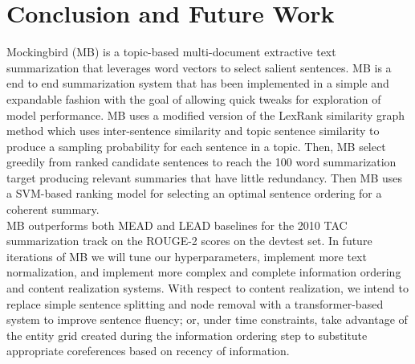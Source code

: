 \documentclass[11pt,a4paper]{article}
\begin{document}
\section{Conclusion and Future Work}
Mockingbird (MB) is a topic-based multi-document extractive text summarization that leverages word vectors to select salient sentences. MB is a end to end summarization system that has been implemented in a simple and expandable fashion with the goal of allowing quick tweaks for exploration of model performance.
MB uses a modified version of the LexRank similarity graph method which uses inter-sentence similarity and topic sentence similarity to produce a sampling probability for each sentence in a topic. Then, MB select greedily from ranked candidate sentences to reach the 100 word summarization target producing relevant summaries that have little redundancy. Then MB uses a SVM-based ranking model for selecting an optimal sentence ordering for a coherent summary.\\
MB outperforms both MEAD and LEAD baselines for the 2010 TAC summarization track on the ROUGE-2 scores on the devtest set.
In future iterations of MB we will tune our hyperparameters, implement more text normalization, and implement more complex and complete information ordering and content realization systems. With respect to content realization, we intend to replace simple sentence splitting and node removal with a transformer-based system to improve sentence fluency; or, under time constraints, take advantage of the entity grid created during the information ordering step to substitute appropriate coreferences based on recency of information. 


\end{document}
